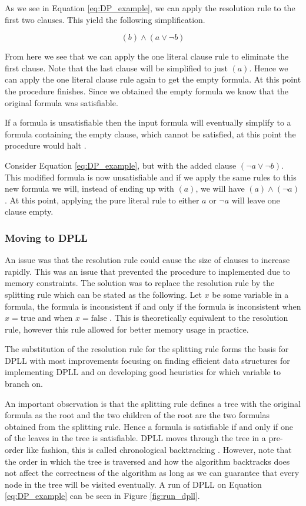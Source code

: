 As we see in Equation \ref{eq:DP_example}, we can apply the resolution rule
to the first two clauses. This yield the following simplification.

\begin{equation}
    (b) \land (a \lor \neg b)
\end{equation}

From here we see that we can apply the one literal clause rule to eliminate
the first clause. Note that the last clause will be simplified to just $(a)$.
Hence we can apply the one literal clause rule again to get the empty formula.
At this point the procedure finishes. Since we obtained the empty formula
we know that the original formula was satisfiable.

If a formula is unsatisfiable then the input formula will eventually
simplify to a formula containing the empty clause, which cannot be satisfied,
at this point the procedure would halt \cite{davis1960computing}.

Consider Equation \ref{eq:DP_example}, but with the added clause $(\neg a \lor \neg b)$.
This modified formula is now unsatisfiable and if we apply the same rules to
this new formula we will, instead of ending up with $(a)$, we will have
$(a) \land (\neg a)$. At this point, applying the pure literal rule to either
$a$ or $\neg a$ will leave one clause empty.

\subsubsection{Moving to DPLL}
An issue was that the
resolution rule could cause the size of clauses to increase rapidly. This
was an issue that prevented the procedure to implemented due to memory constraints.
The solution was to replace the resolution rule by the splitting rule which
can be stated as the following. Let $x$ be some variable in a formula, the formula
is inconsistent if and only if the formula is inconsistent when $x = \text{true}$ and
when $x = \text{false}$ \cite{davis1962machine}. This is theoretically equivalent
to the resolution rule, however this rule allowed for better memory usage in
practice.

The substitution of the resolution rule for the splitting rule forms the basis
for DPLL with most improvements focusing on finding efficient data
structures for implementing DPLL and on developing good heuristics for which
variable to branch on.

An important observation is that the splitting rule defines a tree with
the original formula as the root and the two children of the root are
the two formulas obtained from the splitting rule. Hence a formula is
satisfiable if and only if one of the leaves in the tree is satisfiable.
DPLL moves through the tree in a pre-order like fashion, this is called
chronological backtracking \cite{biere2009conflict}. However, note that
the order in which the tree is traversed and how the algorithm backtracks
does not affect the correctness of the algorithm as long as we can guarantee that every node in the tree will be visited eventually.
A run of DPLL on Equation \ref{eq:DP_example} can be seen in Figure \ref{fig:run_dpll}.

